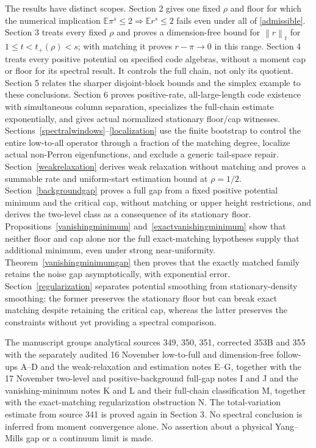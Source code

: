 \documentclass[11pt]{article}
\newcommand{\E}{\mathbb E}
\newcommand{\norm}[1]{\left\|#1\right\|}
\begin{document}
The results have distinct scopes. Section 2 gives one fixed $\rho$ and floor for which the numerical implication $\E\pi^s\leq2\Rightarrow\E r^s\leq2$ fails even under all of \eqref{admissible}. Section 3 treats every fixed $\rho$ and proves a dimension-free bound for $\norm r_t$ for $1\leq t<t_+(\rho)<s$; with matching it proves $r-\pi\to0$ in this range. Section 4 treats every positive potential on specified code algebras, without a moment cap or floor for its spectral result. It controls the full chain, not only its quotient. Section 5 relates the sharper disjoint-block bounds and the simplex example to these conclusions. Section 6 proves positive-rate, all-large-length code existence with simultaneous column separation, specializes the full-chain estimate exponentially, and gives actual normalized stationary floor/cap witnesses. Sections~\ref{spectralwindows}--\ref{localization} use the finite bootstrap to control the entire low-to-all operator through a fraction of the matching degree, localize actual non-Perron eigenfunctions, and exclude a generic tail-space repair. Section~\ref{weakrelaxation} derives weak relaxation without matching and proves a summable rate and uniform-start estimation bound at $\rho=1/2$. Section~\ref{backgroundgap} proves a full gap from a fixed positive potential minimum and the critical cap, without matching or upper height restrictions, and derives the two-level class as a consequence of its stationary floor. Propositions~\ref{vanishingminimum} and~\ref{exactvanishingminimum} show that neither floor and cap alone nor the full exact-matching hypotheses supply that additional minimum, even under strong near-uniformity. Theorem~\ref{vanishingminimumgap} then proves that the exactly matched family retains the noise gap asymptotically, with exponential error. Section~\ref{regularization} separates potential smoothing from stationary-density smoothing: the former preserves the stationary floor but can break exact matching despite retaining the critical cap, whereas the latter preserves the constraints without yet providing a spectral comparison.

The manuscript groups analytical sources 349, 350, 351, corrected 353B and 355 with the separately audited 16 November low-to-full and dimension-free follow-ups A--D and the weak-relaxation and estimation notes E--G, together with the 17 November two-level and positive-background full-gap notes I and J and the vanishing-minimum notes K and L and their full-chain classification M, together with the exact-matching regularization obstruction N. The total-variation estimate from source 341 is proved again in Section 3. No spectral conclusion is inferred from moment convergence alone. No assertion about a physical Yang--Mills gap or a continuum limit is made.
\end{document}
